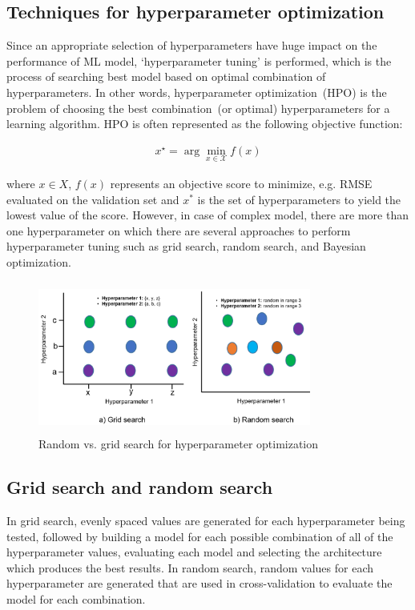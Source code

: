\subsection{Techniques for hyperparameter optimization}
Since an appropriate selection of hyperparameters have huge impact on the performance of ML model, `hyperparameter tuning' is performed, which is the process of searching best model based on optimal combination of hyperparameters. In other words, hyperparameter optimization~(HPO) is the problem of choosing the best combination~(or optimal) hyperparameters for a learning algorithm. HPO is often represented as the following objective function: 

\vspace{-6mm}
\begin{align}
    x^{\star}=\arg \min _{x \in \mathcal{X}} f(x)
    \label{eq:hpt}
\end{align}

\hspace*{3.5mm} where $x \in X$, $f(x)$ represents an objective score to minimize, e.g. RMSE evaluated on the validation set and $x^*$ is the set of hyperparameters to yield the lowest value of the score. However, in case of complex model, there are more than one hyperparameter on which there are several approaches to perform hyperparameter tuning such as grid search, random search, and Bayesian optimization. 

\begin{figure}[h]
	\centering
	\includegraphics[width=0.8\textwidth,height=50mm]{images/gvr.png}
    \caption{Random vs. grid search for hyperparameter optimization}	
	\label{fig:random_vs_grid_search}
	\vspace{-2mm} 
\end{figure}

\subsection{Grid search and random search}
In grid search, evenly spaced values are generated for each hyperparameter being tested, followed by building a model for each possible combination of all of the hyperparameter values, evaluating each model and selecting the architecture which produces the best results. %
In random search, random values for each hyperparameter are generated that are used in cross-validation to evaluate the model for each combination.

